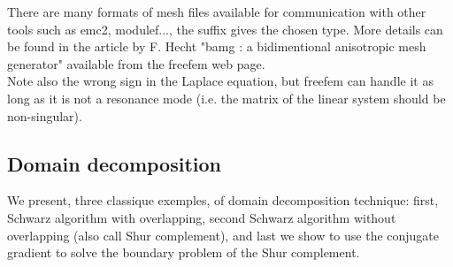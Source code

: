 \documentclass[twoside]{book}
\begin{document}
There are many formats of mesh files available for communication with other tools such as
emc2, modulef..., the suffix gives the chosen type.
More details can be found in the article by F. Hecht "bamg : a bidimentional
anisotropic mesh generator"  available from the freefem web page.
\\
Note also the wrong sign in the Laplace equation, but freefem can handle it as long as it
is not a resonance mode (i.e. the matrix of the linear system should be non-singular).
\subsection{Domain decomposition}
We present, three classique exemples, of domain decomposition
technique:
first, Schwarz algorithm with overlapping, second 
Schwarz algorithm without  overlapping (also call Shur complement), and
last we show to use the conjugate gradient 
to solve the boundary problem of the Shur complement.
 
\end{document}
